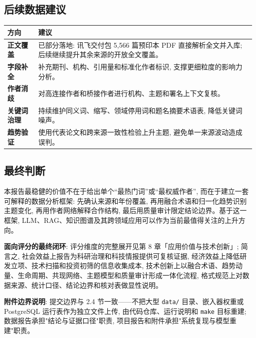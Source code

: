 \subsection{后续数据建议}

\begin{tableblock}
\begin{tabularx}{\textwidth}{>{\bfseries}p{36mm}X}
\toprule
方向 & 建议 \\
\midrule
正文覆盖 & 已部分落地: 讯飞交付包 5{,}566 篇预印本 PDF 直接解析全文并入库; 后续继续提升其余来源的开放全文覆盖。 \\
字段补全 & 补充期刊、机构、引用量和标准化作者标识, 支撑更细粒度的影响力分析。 \\
作者消歧 & 对高连接作者和桥接作者进行机构、主题和署名上下文复核。 \\
关键词治理 & 持续维护同义词、缩写、领域停用词和题名摘要术语表, 降低关键词噪声。 \\
趋势验证 & 使用代表论文和跨来源一致性检验上升主题, 避免单一来源波动造成误判。 \\
\bottomrule
\end{tabularx}
\end{tableblock}

\subsection{最终判断}

\begin{plainbox}
本报告最稳健的价值不在于给出单个“最热门词”或“最权威作者”, 而在于建立一套可解释的数据分析框架: 先确认来源和年份覆盖, 再用融合术语和归一化趋势识别主题变化, 再用作者网络解释合作结构, 最后用质量审计限定结论边界。基于这一框架, LLM、RAG、知识图谱及其跨领域应用可以作为当前最值得关注的上升方向。
\end{plainbox}

\begin{plainbox}
\textbf{面向评分的最终闭环}: 评分维度的完整展开见第 8 章「应用价值与技术创新」; 简言之, 社会效益上报告为科研治理和科技情报提供可复核证据, 经济效益上降低研发立项、技术扫描和投资初筛的信息收集成本, 技术创新上以融合术语、趋势动量、生命周期、共现网络、主题模型和质量审计形成一体化流程, 格式规范上对数据来源、统计口径、结论边界和核对表做显性说明。
\end{plainbox}

\begin{plainbox}
\textbf{附件边界说明}: 提交边界与 2.4 节一致——不把大型 \texttt{data/} 目录、嵌入器权重或 PostgreSQL 运行表作为独立文件上传, 由代码仓库、运行说明和 \texttt{make} 目标重建; 数据报告承担"结论与证据口径"职责, 项目报告和附件承担"系统复现与模型重建"职责。
\end{plainbox}

\clearpage
